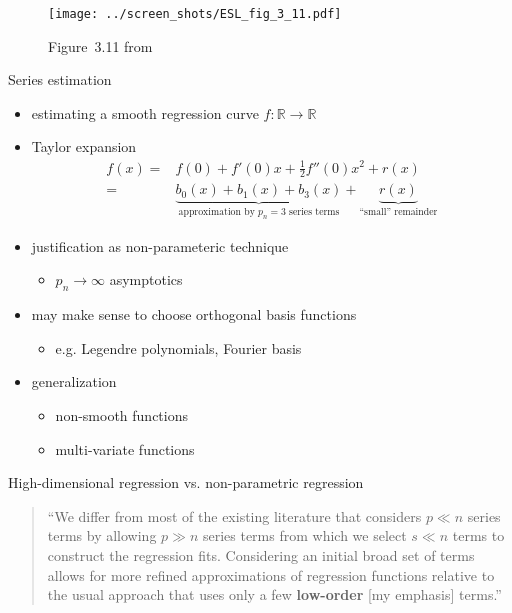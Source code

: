 \documentclass[xcolor=dvipsnames]{beamer}
\begin{document}
\begin{frame}
\begin{figure}
  \texttt{[image: ../screen\_shots/ESL\_fig\_3\_11.pdf]}
   \caption{Figure~3.11 from \textcite{hastie2009elements}}
\end{figure}
\end{frame}


\begin{frame}{Series estimation \parencite{newey1997convergence}}
\begin{itemize}
  \item estimating a smooth regression curve $f: \mathbb{R} \to \mathbb{R}$
  \item Taylor expansion 
  \begin{align*}
    f(x) =& f(0) + f'(0)x + \frac{1}{2} f''(0) x^2 + r(x)
  \\
    =& \underbrace{b_0(x) + b_1(x) + b_{3}(x)}_{\text{approximation by $p_n = 3$ series terms}} + \underbrace{r(x)}_{\text{``small'' remainder}}
  \end{align*}
  \item justification as non-parameteric technique
  \begin{itemize}
    \item 
    $p_n \to \infty$ asymptotics
  \end{itemize}
  \item may make sense to choose orthogonal basis functions
  \begin{itemize}
    \item e.g. Legendre polynomials, Fourier basis
  \end{itemize}
  \item generalization
  \begin{itemize}
    \item non-smooth functions 
    \item multi-variate functions
  \end{itemize}
\end{itemize}
\end{frame}

\begin{frame}{High-dimensional regression vs. non-parametric regression}
\begin{quote}
  ``We differ from most of the existing literature that considers $p \ll n$ series terms by allowing $p \gg n$ series terms from which we select $s \ll n$ terms to construct the regression fits. Considering an initial broad set of terms allows for more refined approximations of regression functions relative to the usual approach that uses only a few \textbf{low-order} [my emphasis] terms.''\parencite{belloni2014inference}
\end{quote}
\end{frame}
\end{document}
